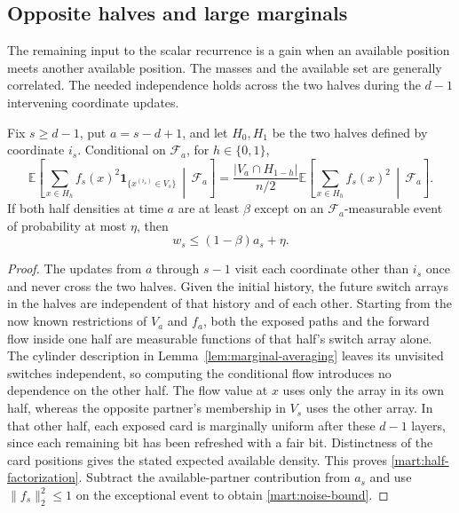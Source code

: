 \subsection{Opposite halves and large marginals}
\label{mart:balance-section}

The remaining input to the scalar recurrence is a gain when an available
position meets another available position.  The masses and the available set
are generally correlated.  The needed independence holds across the
two halves during the $d-1$ intervening coordinate updates.

\begin{lemma}\label{mart:halves}
Fix $s\ge d-1$, put $a=s-d+1$, and let $H_0,H_1$ be the two halves
defined by coordinate $i_s$.  Conditional on $\mathcal F_a$, for
$h\in\{0,1\}$,
\begin{equation}\label{mart:half-factorization}
 \mathbb E\!\left[
  \sum_{x\in H_h}f_s(x)^2\mathbf1_{\{x^{(i_s)}\in V_s\}}
       \,\middle|\,\mathcal F_a\right]
 =\frac{|V_a\cap H_{1-h}|}{n/2}
   \mathbb E\!\left[\sum_{x\in H_h}f_s(x)^2
       \,\middle|\,\mathcal F_a\right].
\end{equation}
If both half densities at time $a$ are at least $\beta$ except on an
$\mathcal F_a$-measurable event of probability at most $\eta$, then
\begin{equation}\label{mart:noise-bound}
 w_s\le(1-\beta)a_s+\eta.
\end{equation}
\end{lemma}
\begin{proof}
The updates from $a$ through $s-1$ visit each coordinate other than
$i_s$ once and never cross the two halves.  Given the initial history,
the future switch arrays in the halves are independent of that history
and of each other.  Starting from the now known restrictions of $V_a$
and $f_a$, both the exposed paths and the forward flow inside one half
are measurable functions of that half's switch array alone.  The
cylinder description in Lemma~\ref{lem:marginal-averaging} leaves
its unvisited switches independent, so computing the conditional flow
introduces no dependence on the other half.  The flow
value at $x$ uses only the array in its own half, whereas the opposite
partner's membership in $V_s$ uses the other array.  In that other
half, each exposed card is marginally uniform after these $d-1$
layers, since each remaining bit has been refreshed with a fair bit.
Distinctness of the card positions gives the stated expected available
density.  This proves \eqref{mart:half-factorization}.  Subtract the
available-partner contribution from $a_s$ and use $\|f_s\|_2^2\le1$
on the exceptional event to obtain \eqref{mart:noise-bound}.
\end{proof}

